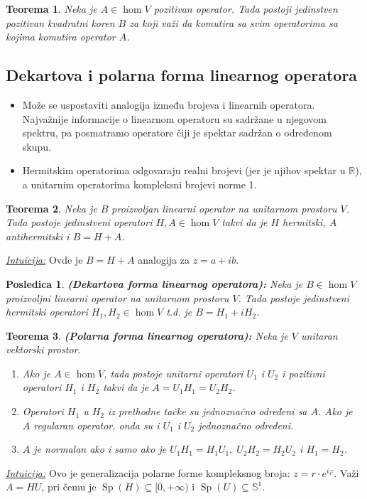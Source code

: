 \documentclass[a4paper,12pt,twoside]{report}
\newtheorem{theorem}{Teorema}[section]
\newtheorem{corollary}{Posledica}[theorem]
\numberwithin{algorithm}{section}
\begin{document}
\begin{theorem}
    Neka je $A \in \hom V$ pozitivan operator. Tada postoji jedinstven pozitivan kvadratni koren $B$ za koji važi da komutira sa 
    svim operatorima sa kojima komutira operator $A$.
\end{theorem}

\subsection{Dekartova i polarna forma linearnog operatora}

\begin{itemize}
    \item Može se uspostaviti analogija između brojeva i linearnih operatora. Najvažnije informacije o linearnom operatoru
    su sadržane u njegovom spektru, pa posmatramo operatore čiji je spektar sadržan o određenom skupu.
    \item Hermitskim operatorima odgovaraju realni brojevi (jer je njihov spektar u $\mathbb{R}$), a unitarnim operatorima kompleksni brojevi norme 1.
\end{itemize}

\begin{theorem}
    Neka je $B$ proizvoljan linearni operator na unitarnom prostoru $V$. Tada postoje jedinstveni operatori $H, A \in \hom V$ 
    takvi da je $H$ hermitski, $A$ antihermitski i $B = H + A$.
\end{theorem}
\noindent\underline{\textit{Intuicija:}} Ovde je $B = H + A$ analogija za $z = a + ib$.

\begin{corollary}
    \textbf{(Dekartova forma linearnog operatora):} Neka je $B \in \hom V$ proizvoljni linearni operator na unitarnom prostoru 
    $V$. Tada postoje jedinstveni hermitski operatori $H_1, H_2 \in \hom V$ t.d. je $B = H_1 + iH_2$.
\end{corollary}

\begin{theorem}
    \textbf{(Polarna forma linearnog operatora):} Neka je $V$ unitaran vektorski prostor.
    \begin{enumerate}
        \item Ako je $A \in \hom V$, tada postoje unitarni operatori $U_1$ i $U_2$ i pozitivni operatori $H_1$ i $H_2$ takvi da je 
        $A = U_1H_1 = U_2H_2$.
        \item Operatori $H_1$ u $H_2$ iz prethodne tačke su jednoznačno određeni sa $A$. Ako je $A$ regularan operator, onda su i
        $U_1$ i $U_2$ jednoznačno određeni.
        \item $A$ je normalan ako i samo ako je $U_1H_1 = H_1U_1, \; U_2H_2 = H_2U_2$ i $H_1 = H_2$.
    \end{enumerate}
\end{theorem}
\noindent\underline{\textit{Intuicija:}} Ovo je generalizacija polarne forme kompleksnog broja: $z = r \cdot e^{i \varphi}$.
Važi $A = HU$, pri čemu je $\operatorname{Sp}(H) \subseteq [0, + \infty)$ i $\operatorname{Sp}(U) \subseteq \mathbb{S}^1$.
\end{document}
